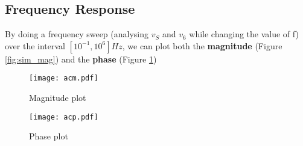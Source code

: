 \subsection{Frequency Response}
\hspace{12pt} By doing a frequency sweep (analysing $v_S$ and $v_6$ while changing the value of f) over the interval $[10^{-1}, 10^6] Hz$, we can plot both the \textbf{magnitude} (Figure \ref{fig:sim_mag}) and the \textbf{phase} (Figure \ref{fig:sim_ph})
\vspace{-25pt}
\begin{figure}
	\begin{minipage}{.45\textwidth}
		\centering
		\texttt{[image: acm.pdf]}
		\caption{Magnitude plot}
		\label{fig:sim_mag}
	\end{minipage}
	\begin{minipage}{.45\textwidth}
		\centering
		\texttt{[image: acp.pdf]}
		\caption{Phase plot}
		\label{fig:sim_ph}
	\end{minipage}
\end{figure}




